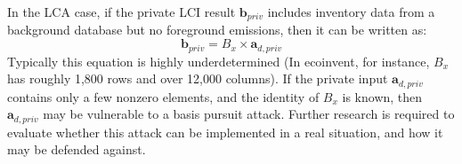 In the LCA case, if the private LCI result $\mathbf{b}_{priv}$ includes inventory data from a background database but no foreground emissions, then it can be written as:
\begin{equation}
  \mathbf{b}_{priv} = B_x\times \mathbf{a}_{d,priv}
\end{equation}
Typically this equation is highly underdetermined (In ecoinvent, for instance, $B_x$ has roughly 1,800 rows and over 12,000 columns).  If the private input $\mathbf{a}_{d,priv}$ contains only a few nonzero elements, and the identity of $B_x$ is known, then $\mathbf{a}_{d,priv}$ may be vulnerable to a basis pursuit attack.  Further research is required to evaluate whether this attack can be implemented in a real situation, and how it may be defended against.  
